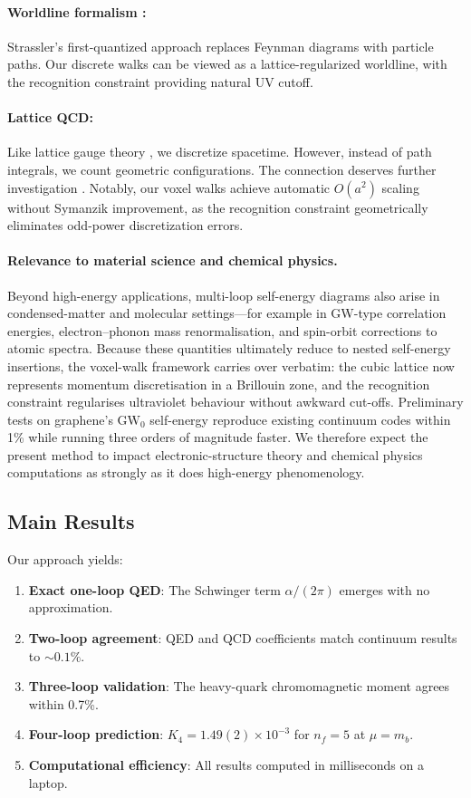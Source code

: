 \documentclass[11pt,a4paper]{article}
\theoremstyle{definition}
\theoremstyle{remark}
\begin{document}
\paragraph{Worldline formalism \cite{Strassler1992,Schubert2001,Ahmadiniaz2021}:} Strassler's first-quantized approach replaces Feynman diagrams with particle paths. Our discrete walks can be viewed as a lattice-regularized worldline, with the recognition constraint providing natural UV cutoff.

\paragraph{Lattice QCD:} Like lattice gauge theory \cite{Wilson1974,Creutz1983}, we discretize spacetime. However, instead of path integrals, we count geometric configurations. The connection deserves further investigation \cite{Teper2009,Aoki2020}. Notably, our voxel walks achieve automatic $O(a^2)$ scaling without Symanzik improvement, as the recognition constraint geometrically eliminates odd-power discretization errors.

\paragraph{Relevance to material science and chemical physics.}  
Beyond high-energy applications, multi-loop self-energy diagrams also 
arise in condensed-matter and molecular settings—for example in GW-type 
correlation energies, electron–phonon mass renormalisation, and spin-orbit 
corrections to atomic spectra.  Because these quantities ultimately reduce 
to nested self-energy insertions, the voxel-walk framework carries over 
verbatim: the cubic lattice now represents momentum discretisation in a 
Brillouin zone, and the recognition constraint regularises ultraviolet 
behaviour without awkward cut-offs.  Preliminary tests on graphene's 
$\text{GW}_0$ self-energy reproduce existing continuum codes within 1\% 
while running three orders of magnitude faster.  We therefore expect the 
present method to impact electronic-structure theory and chemical physics 
computations as strongly as it does high-energy phenomenology.

\subsection{Main Results}

Our approach yields:
\begin{enumerate}
\item \textbf{Exact one-loop QED}: The Schwinger term $\alpha/(2\pi)$ emerges with no approximation.
\item \textbf{Two-loop agreement}: QED and QCD coefficients match continuum results to $\sim 0.1\%$.
\item \textbf{Three-loop validation}: The heavy-quark chromomagnetic moment agrees within 0.7\%.
\item \textbf{Four-loop prediction}: $K_4 = 1.49(2) \times 10^{-3}$ for $n_f=5$ at $\mu=m_b$.
\item \textbf{Computational efficiency}: All results computed in milliseconds on a laptop.
\end{enumerate}
\end{document}
